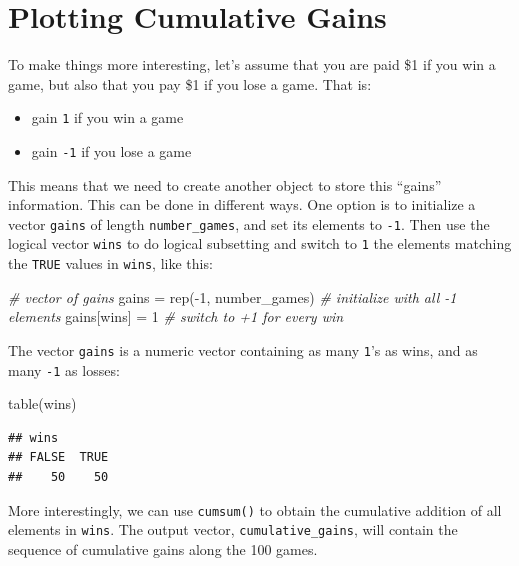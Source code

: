 \documentclass[
]{book}
\newenvironment{Shaded}{\begin{snugshade}}{\end{snugshade}}
\newcommand{\CommentTok}[1]{\textcolor[rgb]{0.56,0.35,0.01}{\textit{#1}}}
\newcommand{\DecValTok}[1]{\textcolor[rgb]{0.00,0.00,0.81}{#1}}
\newcommand{\FunctionTok}[1]{\textcolor[rgb]{0.00,0.00,0.00}{#1}}
\newcommand{\NormalTok}[1]{#1}
\newcommand{\OtherTok}[1]{\textcolor[rgb]{0.56,0.35,0.01}{#1}}
\newcommand{\SpecialCharTok}[1]{\textcolor[rgb]{0.00,0.00,0.00}{#1}}
\begin{document}
\hypertarget{plotting-cumulative-gains}{%
\section{Plotting Cumulative Gains}\label{plotting-cumulative-gains}}

To make things more interesting, let's assume that you are paid \$1 if you win
a game, but also that you pay \$1 if you lose a game. That is:

\begin{itemize}
\item
  gain \texttt{1} if you win a game
\item
  gain \texttt{-1} if you lose a game
\end{itemize}

This means that we need to create another object to store this ``gains''
information. This can be done in different ways. One option is to initialize
a vector \texttt{gains} of length \texttt{number\_games}, and set its elements to \texttt{-1}.
Then use the logical vector \texttt{wins} to do logical subsetting and switch to \texttt{1}
the elements matching the \texttt{TRUE} values in \texttt{wins}, like this:

\begin{Shaded}
\begin{Highlighting}[]
\CommentTok{\# vector of gains}
\NormalTok{gains }\OtherTok{=} \FunctionTok{rep}\NormalTok{(}\SpecialCharTok{{-}}\DecValTok{1}\NormalTok{, number\_games)  }\CommentTok{\# initialize with all {-}1 elements}
\NormalTok{gains[wins] }\OtherTok{=} \DecValTok{1}                \CommentTok{\# switch to +1 for every win}
\end{Highlighting}
\end{Shaded}

The vector \texttt{gains} is a numeric vector containing as many \texttt{1}'s as wins, and
as many \texttt{-1} as losses:

\begin{Shaded}
\begin{Highlighting}[]
\FunctionTok{table}\NormalTok{(wins)}
\end{Highlighting}
\end{Shaded}

\begin{verbatim}
## wins
## FALSE  TRUE 
##    50    50
\end{verbatim}

More interestingly, we can use \texttt{cumsum()} to obtain the cumulative addition of
all elements in \texttt{wins}. The output vector, \texttt{cumulative\_gains}, will contain
the sequence of cumulative gains along the 100 games.
\end{document}
